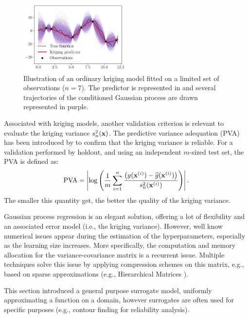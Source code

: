 \begin{figure}[ht]
    \centering
    \includegraphics[width=0.5\textwidth]{../numerical_experiments/chapter1/figures/kriging_1D.png}
    \caption{Illustration of an ordinary kriging model fitted on a limited set of observations ($n=7$). 
    The predictor is represented in and several trajectories of the conditioned Gaussian process are drawn represented in purple.}
    \label{fig:kriging_1D}
\end{figure}


Associated with kriging models, another validation criterion is relevant to evaluate the kriging variance $s_n^2({\bf x})$. 
The predictive variance adequation (PVA) has been introduced by \citet{bachoc_2013} to confirm that the kriging variance is reliable. 
For a validation performed by holdout, and using an independent $m$-sized test set, the PVA is defined as: 
\begin{equation}
    \mathrm{PVA} = \left| \log\left( \frac1m \sum_{i=1}^{n} \frac{\left(y({\bf x}^{(i)}) - \widehat{g}({\bf x}^{(i)})\right)}{s_n^2({\bf x}^{(i)})}\right) \right|.
\end{equation}
The smaller this quantity get, the better the quality of the kriging variance. 

Gaussian process regression is an elegant solution, offering a lot of flexibility and an associated error model (i.e., the kriging variance). 
However, well know numerical issues appear during the estimation of the hyperparameters, especially as the learning size increases. 
More specifically, the computation and memory allocation for the variance-covariance matrix is a recurrent issue. 
Multiple techniques solve this issue by applying compression schemes on this matrix, e.g., based on sparse approximations (e.g., Hierarchical Matrices \citet{geoga_2020_hmat_gp}). 

This section introduced a general purpose surrogate model, uniformly approximating a function on a domain, however surrogates are often used for specific purposes (e.g., contour finding for reliability analysis). 


